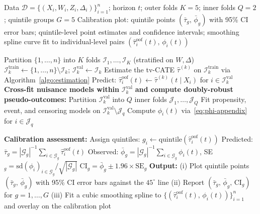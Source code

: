 \documentclass{article}
\newcommand{\hattau}{\hat{\tau}}
\begin{document}
\begin{algorithm}[H]
\caption{Cross-Validated Calibration-for-Benefit}
\label{alg:cv-calibration-appendix}
\begin{algorithmic}[1]
\Require Data $\mathcal{D} = \{(X_i, W_i, Z_i, \Delta_i)\}_{i=1}^n$; horizon $t$; outer folds $K=5$; inner folds $Q=2$; quintile groups $G=5$
\Ensure Calibration plot: quintile points $(\bar{\tau}_g,\, \bar{\phi}_g)$ with 95\% CI error bars; quintile-level point estimates and confidence intervals; smoothing spline curve fit to individual-level pairs $(\hattau^{\mathrm{oof}}_i(t),\, \phi_i(t))$

\Statex
\State Partition $\{1, \ldots, n\}$ into $K$ folds $\mathcal{I}_1, \ldots, \mathcal{I}_K$ (stratified on $W, \Delta$)
    \State $\mathcal{I}^{\mathrm{train}}_k \gets \{1,\ldots,n\} \setminus \mathcal{I}_k$; \quad $\mathcal{I}^{\mathrm{val}}_k \gets \mathcal{I}_k$
    \State Estimate the tv-CATE $\hattau^{(k)}$ on $\mathcal{I}^{\mathrm{train}}_k$ via Algorithm~\ref{algo:estimation}
    \State Predict: $\hattau^{\mathrm{oof}}_i(t) \gets \hattau^{(k)}(t \mid X_i)$ for $i \in \mathcal{I}^{\mathrm{val}}_k$
    \Statex
    \State \textbf{Cross-fit nuisance models within} $\mathcal{I}^{\mathrm{val}}_k$ \textbf{and compute doubly-robust pseudo-outcomes:}
    \State Partition $\mathcal{I}^{\mathrm{val}}_k$ into $Q$ inner folds $\mathcal{J}_1, \ldots, \mathcal{J}_Q$
        \State Fit propensity, event, and censoring models on $\mathcal{I}^{\mathrm{val}}_k \setminus \mathcal{J}_q$
        \State Compute $\phi_i(t)$ via~\eqref{eq:phi-appendix} for $i \in \mathcal{J}_q$
    \EndFor
\EndFor

\Statex
\State \textbf{Calibration assessment:}
\State Assign quintiles: $g_i \gets \mathrm{quintile}(\hattau^{\mathrm{oof}}_i(t))$
    \State Predicted: $\bar{\tau}_g = |\mathcal{G}_g|^{-1}\sum_{i \in \mathcal{G}_g} \hattau^{\mathrm{oof}}_i(t)$
    \State Observed: $\bar{\phi}_g = |\mathcal{G}_g|^{-1}\sum_{i \in \mathcal{G}_g} \phi_i(t)$, \quad SE$_g = \mathrm{sd}(\phi_i)_{i \in \mathcal{G}_g} / \sqrt{|\mathcal{G}_g|}$
    \State CI$_g = \bar{\phi}_g \pm 1.96 \times \mathrm{SE}_g$
\EndFor
\Statex
\State \textbf{Output:}
\State \hspace{\algorithmicindent} (i) Plot quintile points $(\bar{\tau}_g,\, \bar{\phi}_g)$ with 95\% CI error bars against the $45^\circ$ line
\State \hspace{\algorithmicindent} (ii) Report $(\bar{\tau}_g,\, \bar{\phi}_g,\, \mathrm{CI}_g)$ for $g = 1, \ldots, G$
\State \hspace{\algorithmicindent} (iii) Fit a cubic smoothing spline to $\{(\hattau^{\mathrm{oof}}_i(t),\, \phi_i(t))\}_{i=1}^n$ and overlay on the calibration plot
\end{algorithmic}
\end{algorithm}
\end{document}
